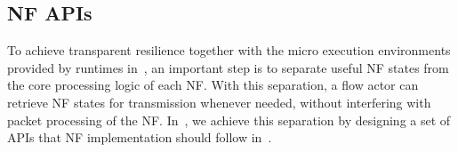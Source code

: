 

\subsection{NF APIs}
\label{sec:NFAPIs}

To achieve transparent resilience together with the micro execution environments provided by runtimes in~\nfactor, an important step is to separate useful NF states from the core processing logic of each NF. With this separation, a flow actor can retrieve %
NF states for transmission whenever needed, without interfering with packet processing of the NF. In~\nfactor, we achieve this separation by designing a set of APIs that NF implementation should follow in~\nfactor.

